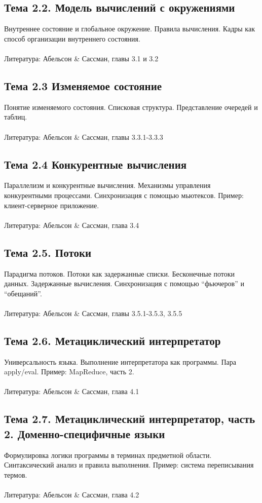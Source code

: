 \documentclass[a4paper,11pt]{article}
\begin{document}
\subsection*{Тема 2.2. Модель вычислений с окружениями}
Внутреннее состояние и глобальное окружение. Правила вычисления. Кадры как
способ организации внутреннего состояния.
\\\\
Литература: Абельсон \& Сассман, главы 3.1 и 3.2

\subsection*{Тема 2.3 Изменяемое состояние}
Понятие изменяемого состояния. Списковая структура. Представление очередей
и таблиц.
\\\\
Литература: Абельсон \& Сассман, главы 3.3.1-3.3.3

\subsection*{Тема 2.4 Конкурентные вычисления}
Параллелизм и конкурентные вычисления. Механизмы управления конкурентными
процессами. Синхронизация с помощью мьютексов. Пример: клиент-серверное
приложение.
\\\\
Литература: Абельсон \& Сассман, глава 3.4

\subsection*{Тема 2.5. Потоки}
Парадигма потоков. Потоки как задержанные списки. Бесконечные потоки данных.
Задержанные вычисления. Синхронизация с помощью ``фьючеров'' и ``обещаний''.
\\\\
Литература: Абельсон \& Сассман, главы 3.5.1-3.5.3, 3.5.5

\subsection*{Тема 2.6. Метациклический интерпретатор}
Универсальность языка. Выполнение интерпретатора как программы. Пара
apply/eval. Пример: MapReduce, часть 2.
\\\\
Литература: Абельсон \& Сассман, глава 4.1

\subsection*{Тема 2.7. Метациклический интерпретатор, часть 2. Доменно-специфичные языки}
Формулировка логики программы в терминах предметной области. Синтаксический
анализ и правила выполнения. Пример: система переписывания термов.
\\\\
Литература: Абельсон \& Сассман, глава 4.2
\end{document}

